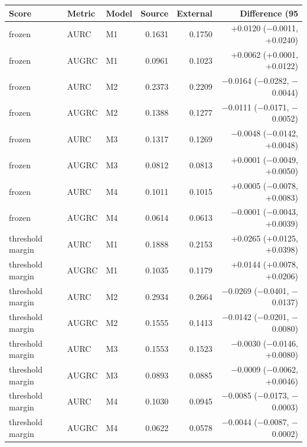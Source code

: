 \begin{tabular}{lllrrr}
\toprule
Score & Metric & Model & Source & External & Difference (95\\%
\midrule
frozen & AURC & M1 & 0.1631 & 0.1750 & +0.0120 ($-$0.0011, +0.0240)\\
frozen & AUGRC & M1 & 0.0961 & 0.1023 & +0.0062 (+0.0001, +0.0122)\\
frozen & AURC & M2 & 0.2373 & 0.2209 & $-$0.0164 ($-$0.0282, $-$0.0044)\\
frozen & AUGRC & M2 & 0.1388 & 0.1277 & $-$0.0111 ($-$0.0171, $-$0.0052)\\
frozen & AURC & M3 & 0.1317 & 0.1269 & $-$0.0048 ($-$0.0142, +0.0048)\\
frozen & AUGRC & M3 & 0.0812 & 0.0813 & +0.0001 ($-$0.0049, +0.0050)\\
frozen & AURC & M4 & 0.1011 & 0.1015 & +0.0005 ($-$0.0078, +0.0083)\\
frozen & AUGRC & M4 & 0.0614 & 0.0613 & $-$0.0001 ($-$0.0043, +0.0039)\\
threshold margin & AURC & M1 & 0.1888 & 0.2153 & +0.0265 (+0.0125, +0.0398)\\
threshold margin & AUGRC & M1 & 0.1035 & 0.1179 & +0.0144 (+0.0078, +0.0206)\\
threshold margin & AURC & M2 & 0.2934 & 0.2664 & $-$0.0269 ($-$0.0401, $-$0.0137)\\
threshold margin & AUGRC & M2 & 0.1555 & 0.1413 & $-$0.0142 ($-$0.0201, $-$0.0080)\\
threshold margin & AURC & M3 & 0.1553 & 0.1523 & $-$0.0030 ($-$0.0146, +0.0080)\\
threshold margin & AUGRC & M3 & 0.0893 & 0.0885 & $-$0.0009 ($-$0.0062, +0.0046)\\
threshold margin & AURC & M4 & 0.1030 & 0.0945 & $-$0.0085 ($-$0.0173, $-$0.0003)\\
threshold margin & AUGRC & M4 & 0.0622 & 0.0578 & $-$0.0044 ($-$0.0087, $-$0.0002)\\
\bottomrule
\end{tabular}
